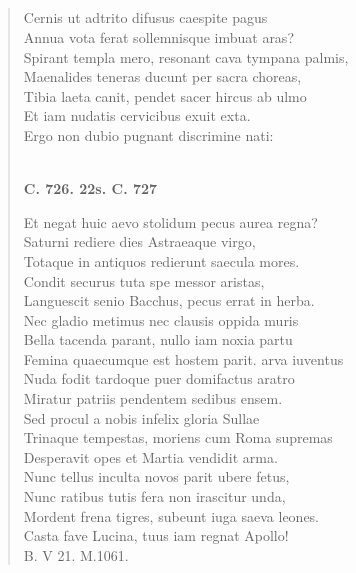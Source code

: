 \documentclass[11pt, a4paper]{report}
\begin{document}
            \subsection*{}
      \begin{verse}
      Cernis ut adtrito difusus caespite pagus \\ Annua vota ferat sollemnisque imbuat aras? \\ Spirant templa mero, resonant cava tympana palmis, \\ Maenalides teneras ducunt per sacra choreas, \\ Tibia laeta canit, pendet sacer hircus ab ulmo \\ Et iam nudatis cervicibus exuit exta. \\ Ergo non dubio pugnant discrimine nati: \\ 
        ﻿\pagebreak 
     \marginpar{[214]}  \marginpar{[01]} \begin{center} \textbf{C. 726. 22s. C. 727} \end{center}Et negat huic aevo stolidum pecus aurea regna? \\ Saturni rediere dies Astraeaque virgo, \\ Totaque in antiquos redierunt saecula mores. \\ Condit securus tuta spe messor aristas, \\ Languescit senio Bacchus, pecus errat in herba. \\ Nec gladio metimus nec clausis oppida muris \\ Bella tacenda parant, nullo iam noxia partu \\ Femina quaecumque est hostem parit. arva iuventus \\ Nuda fodit tardoque puer domifactus aratro \\ Miratur patriis pendentem sedibus ensem. \\ Sed procul a nobis infelix gloria Sullae \\ Trinaque tempestas, moriens cum Roma supremas \\ Desperavit  \lbrack opes \rbrack  et Martia vendidit arma. \\ Nunc tellus inculta novos parit ubere fetus, \\ Nunc ratibus tutis fera non irascitur unda, \\ Mordent frena tigres, subeunt iuga saeva leones. \\ Casta fave Lucina, tuus iam regnat Apollo! \\ B. V 21. M.1061. \\ 
      \end{verse}
  
\end{document}
